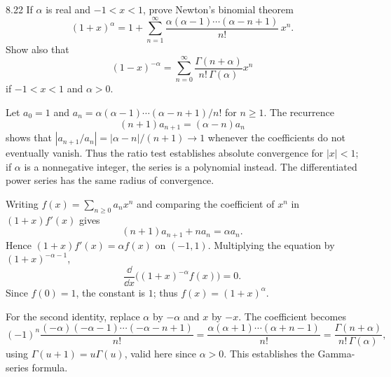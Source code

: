 \documentclass[11pt, oneside]{article}
\begin{document}
\begin{exercise}{8.22}
If $\alpha$ is real and $-1<x<1$, prove Newton's binomial theorem
\[
 (1+x)^\alpha=1+\sum_{n=1}^\infty
 \frac{\alpha(\alpha-1)\cdots(\alpha-n+1)}{n!}\,x^n.
\]
Show also that
\[
 (1-x)^{-\alpha}=\sum_{n=0}^\infty\frac{\Gamma(n+\alpha)}{n!\,\Gamma(\alpha)}x^n
\]
if $-1<x<1$ and $\alpha>0$.
\end{exercise}
\begin{solution}
Let $a_0=1$ and $a_n=\alpha(\alpha-1)\cdots(\alpha-n+1)/n!$ for $n\ge1$. The recurrence
\[
 (n+1)a_{n+1}=(\alpha-n)a_n
\]
shows that $|a_{n+1}/a_n|=|\alpha-n|/(n+1)\to1$ whenever the coefficients do not eventually vanish. Thus the ratio test establishes absolute convergence for $|x|<1$; if $\alpha$ is a nonnegative integer, the series is a polynomial instead. The differentiated power series has the same radius of convergence.

Writing $f(x)=\sum_{n\ge0}a_nx^n$ and comparing the coefficient of $x^n$ in $(1+x)f'(x)$ gives
\[
 (n+1)a_{n+1}+na_n=\alpha a_n.
\]
Hence $(1+x)f'(x)=\alpha f(x)$ on $(-1, 1)$. Multiplying the equation by $(1+x)^{-\alpha-1}$,
\[
 \frac{\dd}{\dd x}\bigl((1+x)^{-\alpha}f(x)\bigr)=0.
\]
Since $f(0)=1$, the constant is $1$; thus $f(x)=(1+x)^\alpha$.

For the second identity, replace $\alpha$ by $-\alpha$ and $x$ by $-x$. The coefficient becomes
\[
 (-1)^n\frac{(-\alpha)(-\alpha-1)\cdots(-\alpha-n+1)}{n!}
 =\frac{\alpha(\alpha+1)\cdots(\alpha+n-1)}{n!}
 =\frac{\Gamma(n+\alpha)}{n!\,\Gamma(\alpha)},
\]
using $\Gamma(u+1)=u\Gamma(u)$, valid here since $\alpha>0$. This establishes the Gamma-series formula.
\end{solution}
\end{document}
